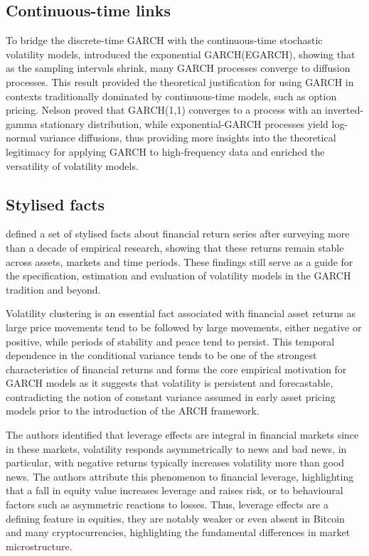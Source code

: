 \documentclass[12pt]{report}
\begin{document}
\subsection{Continuous-time links}
To bridge the discrete-time GARCH with the continuous-time stochastic volatility models, \cite{nelson1990archdiffusion} introduced the exponential GARCH(EGARCH), showing that as the sampling intervals shrink, many GARCH processes converge to diffusion processes. This result provided the theoretical justification for using GARCH in contexts traditionally dominated by continuous-time models, such as option pricing. Nelson proved that GARCH(1,1) converges to a process with an inverted-gamma stationary distribution, while exponential-GARCH processes yield log-normal variance diffusions, thus providing more insights into the theoretical legitimacy for applying GARCH to high-frequency data and enriched the versatility of volatility models.

\subsection{Stylised facts}

\cite{bollerslev1994archsurvey} defined a set of stylised facts about financial return series after surveying more than a decade of empirical research, showing that these returns remain stable across assets, markets and time periods. These findings still serve as a guide for the specification, estimation and evaluation of volatility models in the GARCH tradition and beyond. 

Volatility clustering is an essential fact associated with financial asset returns as large price movements tend to be followed by large movements, either negative or positive, while periods of stability and peace tend to persist. This temporal dependence in the conditional variance tends to be one of the strongest characteristics of financial returns and forms the core empirical motivation for GARCH models as it suggests that volatility is persistent and forecastable, contradicting the notion of constant variance assumed in early asset pricing models prior to the introduction of the ARCH framework.
 
The authors identified that leverage effects are integral in financial markets since in these markets, volatility responds asymmetrically to news and bad news, in particular, with negative returns typically increases volatility more than good news. The authors attribute this phenomenon to financial leverage, highlighting that a fall in equity value increases leverage and raises risk, or to behavioural factors such as asymmetric reactions to losses. Thus, leverage effects are a defining feature in equities, they are notably weaker or even absent in Bitcoin and many cryptocurrencies, highlighting the fundamental differences in market microstructure.
\end{document}
